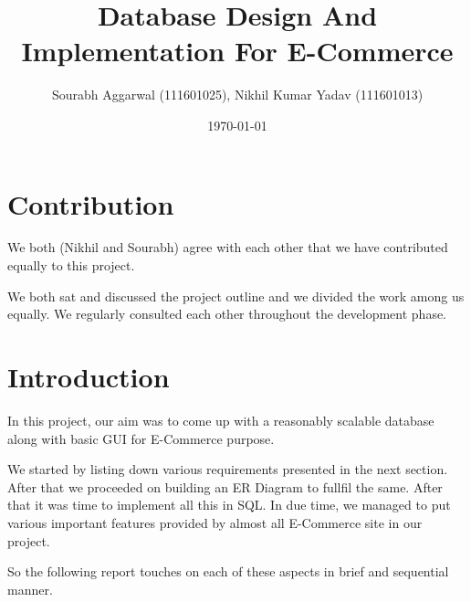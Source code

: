 \documentclass[a4paper,12pt]{article}
\begin{document}
\title{Database Design And Implementation For E-Commerce}
\author{\small{Sourabh Aggarwal (111601025), Nikhil Kumar Yadav (111601013)}}
\date{\today}
\maketitle
{}
\tableofcontents
\newpage
{}

\section{Contribution}
We both (Nikhil and Sourabh) agree with each other that we have contributed equally to this project. 

We both sat and discussed the project outline and we divided the work among us equally. We regularly consulted each other throughout the development phase.

\section{Introduction}
In this project, our aim was to come up with a reasonably scalable database along with basic GUI for E-Commerce purpose.

We started by listing down various requirements presented in the next section. After that we proceeded on building an ER Diagram to fullfil the same. After that it was time to implement all this in SQL. In due time, we managed to put various important features provided by almost all E-Commerce site in our project. 

So the following report touches on each of these aspects in brief and sequential manner. 
\end{document}
